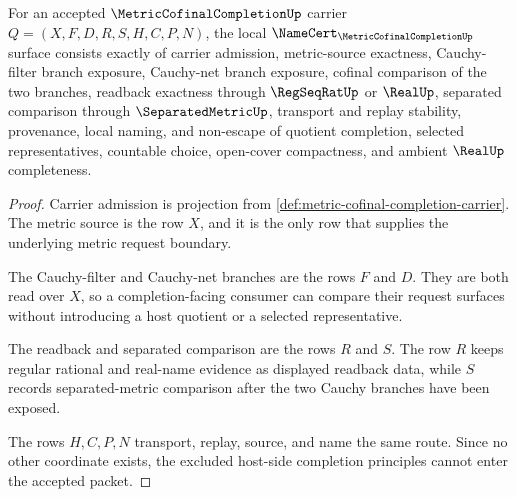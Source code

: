 \begin{theorem}
\label{thm:metric-cofinal-completion-namecert-obligations}
For an accepted $\MetricCofinalCompletionUp$ carrier $Q=(X,F,D,R,S,H,C,P,N)$, the local $\NameCert_{\MetricCofinalCompletionUp}$ surface consists exactly of carrier admission, metric-source exactness, Cauchy-filter branch exposure, Cauchy-net branch exposure, cofinal comparison of the two branches, readback exactness through $\RegSeqRatUp$ or $\RealUp$, separated comparison through $\SeparatedMetricUp$, transport and replay stability, provenance, local naming, and non-escape of quotient completion, selected representatives, countable choice, open-cover compactness, and ambient $\RealUp$ completeness.
\end{theorem}
\begin{proof}
Carrier admission is projection from \autoref{def:metric-cofinal-completion-carrier}. The metric source is the row $X$, and it is the only row that supplies the underlying metric request boundary.

The Cauchy-filter and Cauchy-net branches are the rows $F$ and $D$. They are both read over $X$, so a completion-facing consumer can compare their request surfaces without introducing a host quotient or a selected representative.

The readback and separated comparison are the rows $R$ and $S$. The row $R$ keeps regular rational and real-name evidence as displayed readback data, while $S$ records separated-metric comparison after the two Cauchy branches have been exposed.

The rows $H,C,P,N$ transport, replay, source, and name the same route. Since no other coordinate exists, the excluded host-side completion principles cannot enter the accepted packet.
\end{proof}

